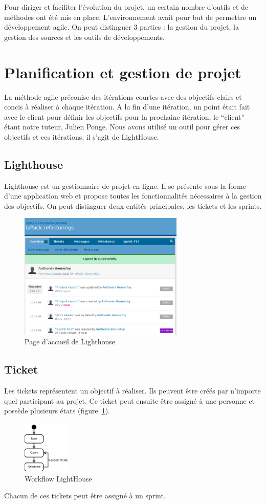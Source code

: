 Pour diriger et faciliter l'évolution du projet, un certain nombre d'outils et de méthodes ont été mis en place.
L'environnement avait pour but de permettre un développement agile.
On peut distinguer 3 parties : la gestion du projet, la gestion des sources et les outils de développements.
\section{Planification et gestion de projet}
La méthode agile préconise des itérations courtes avec des objectifs clairs et concis à réaliser à chaque itération.
A la fin d'une itération, un point était fait avec le client pour définir les objectifs pour la prochaine itération, le ``client'' étant notre tuteur, Julien Ponge.
Nous avons utilisé un outil pour gérer ces objectifs et ces itérations, il s'agit de LightHouse.

\subsection{Lighthouse}
Lighthouse est un gestionnaire de projet en ligne.
Il se présente sous la forme d'une application web et propose toutes les fonctionnalités nécessaires à la gestion des objectifs.
On peut distinguer deux entités principales, les tickets et les sprints.
\begin{figure}[H]
	\centering
	\includegraphics[width=0.7\textwidth]{../image/lighthouse.png}
	\caption{Page d'accueil de Lighthouse}
\end{figure}

\subsection{Ticket}
Les tickets représentent un objectif à réaliser.
Ils peuvent être créés par n'importe quel participant au projet.
Ce ticket peut ensuite être assigné à une personne et possède plusieurs états (figure~\ref{fig:workflow}).
\begin{figure}[H]
	\centering
	\includegraphics[width=0.2\textwidth]{../image/lighthouseWorkFlow.png}
	\caption{Workflow LightHouse}
\label{fig:workflow}
\end{figure}
Chacun de ces tickets peut être assigné à un sprint.

